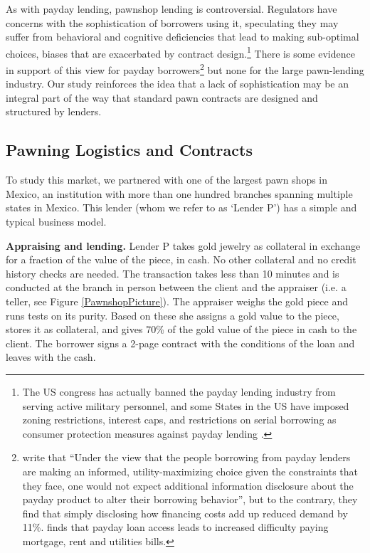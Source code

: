 \documentclass[ecta,nameyear,final]{econsocart}
\begin{document}
As with payday lending, pawnshop lending is controversial. Regulators have concerns with the sophistication of borrowers using it, speculating they may suffer from behavioral and cognitive deficiencies that lead to making sub-optimal choices, biases that are exacerbated by contract design.\footnote{The US congress has actually banned the payday lending industry from serving active military personnel, and some States in the US have imposed zoning restrictions, interest caps, and restrictions on serial borrowing as consumer protection measures against payday lending \citep{Payday}.} There is some evidence in support of this view for payday borrowers\footnote{\cite{Bertrand} write that ``Under the view that the people borrowing from payday lenders are making an informed, utility-maximizing choice given the constraints that they face, one would not expect additional information disclosure about the payday product to alter their borrowing behavior'', but to the contrary, they find that simply disclosing how financing costs add up reduced demand by 11\%. \cite{Meltzer} finds that payday loan access leads to increased difficulty paying mortgage, rent and utilities bills.} but none for the large pawn-lending industry. Our study reinforces the idea that a lack of sophistication may be an integral part of the way that standard pawn contracts are designed and structured by lenders.



\subsection{Pawning Logistics and Contracts}

To study this market, we partnered with one of the largest pawn shops in Mexico, an institution with more than one hundred branches spanning multiple states in Mexico. This lender (whom we refer to as `Lender P') has a simple and typical business model. 

\noindent \textbf{Appraising and lending.} Lender P takes gold jewelry as collateral in exchange for a fraction of the value of the piece, in cash. No other collateral and no credit history checks are needed. The transaction takes less than 10 minutes and is conducted at the branch in person between the client and the appraiser (i.e. a teller, see Figure \ref{PawnshopPicture}). The appraiser weighs the gold piece and runs tests on its purity. Based on these she assigns a gold value to the piece, stores it as collateral, and gives 70\% of the gold value of the piece in cash to the client. The borrower signs a 2-page contract with the conditions of the loan and leaves with the cash.
\end{document}
